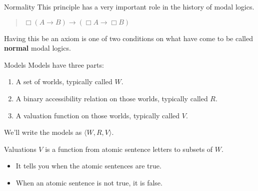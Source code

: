\documentclass[
  14pt,
  letterpaper,
  ignorenonframetext,
  aspectratio=169,
  handout]{beamer}
\providecommand{\tightlist}{%
  \setlength{\itemsep}{0pt}\setlength{\parskip}{0pt}}\usepackage{longtable,booktabs,array}
\begin{document}
\begin{frame}{Normality}
\protect\hypertarget{normality-1}{}
This principle has a very important role in the history of modal logics.

\begin{quote}
\(\Box (A \rightarrow B) \rightarrow (\Box A \rightarrow \Box B)\)
\end{quote}

Having this be an axiom is one of two conditions on what have come to be
called \textbf{normal} modal logics.
\end{frame}

\begin{frame}{Models}
\protect\hypertarget{models}{}
Models have three parts:

\begin{enumerate}[<+->]
\tightlist
\item
  A set of worlds, typically called \(W\).
\item
  A binary accessibility relation on those worlds, typically called
  \(R\).
\item
  A valuation function on those worlds, typically called \(V\).
\end{enumerate}

We'll write the models as \(\langle W, R, V\rangle\).
\end{frame}

\begin{frame}{Valuations}
\protect\hypertarget{valuations-1}{}
\(V\) is a function from atomic sentence letters to subsets of \(W\).

\begin{itemize}[<+->]
\tightlist
\item
  It tells you when the atomic sentences are true.
\item
  When an atomic sentence is not true, it is false.
\end{itemize}
\end{frame}
\end{document}
